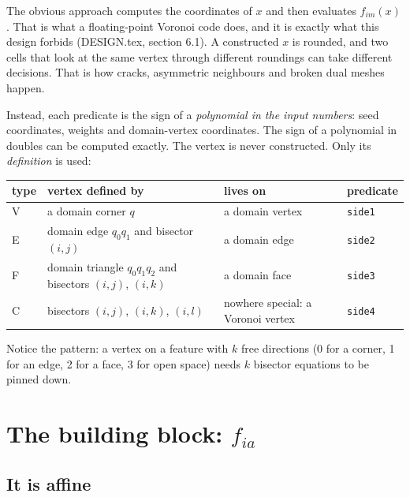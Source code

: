 \documentclass[11pt,a4paper]{article}
\newcommand{\code}[1]{\texttt{#1}}
\theoremstyle{remark}
\begin{document}
The obvious approach computes the coordinates of $x$ and then evaluates $f_{im}(x)$. That is
what a floating-point Voronoi code does, and it is exactly what this design forbids
(DESIGN.tex, section 6.1). A constructed $x$ is rounded, and two cells that look at the same
vertex through different roundings can take different decisions. That is how cracks,
asymmetric neighbours and broken dual meshes happen.

Instead, each predicate is the sign of a \emph{polynomial in the input numbers}: seed
coordinates, weights and domain-vertex coordinates. The sign of a polynomial in doubles can be
computed exactly. The vertex is never constructed. Only its \emph{definition} is used:

\begin{center}
\begin{tabularx}{\linewidth}{@{}l l L l@{}}
\toprule
type & vertex defined by & lives on & predicate \\
\midrule
V & a domain corner $q$ & a domain vertex & \code{side1} \\
E & domain edge $q_0q_1$ and bisector $(i,j)$ & a domain edge & \code{side2} \\
F & domain triangle $q_0q_1q_2$ and bisectors $(i,j)$, $(i,k)$ & a domain face & \code{side3} \\
C & bisectors $(i,j)$, $(i,k)$, $(i,l)$ & nowhere special: a Voronoi vertex & \code{side4} \\
\bottomrule
\end{tabularx}
\end{center}

\noindent
Notice the pattern: a vertex on a feature with $k$ free directions (0 for a corner, 1 for an
edge, 2 for a face, 3 for open space) needs $k$ bisector equations to be pinned down.

\section{The building block: \texorpdfstring{$f_{ia}$}{f\_ia}}\label{sec:f}

\subsection{It is affine}
\end{document}
